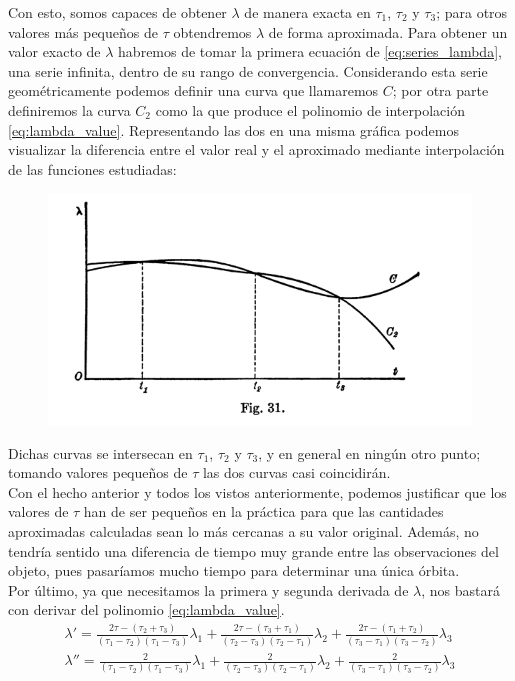 \documentclass[11pt]{article}
\begin{document}
Con esto, somos capaces de obtener $\lambda$ de manera exacta en $\tau_1$, $\tau_2$ y $\tau_3$; para otros valores más pequeños de $\tau$ obtendremos $\lambda$ de forma aproximada. Para obtener un valor exacto de $\lambda$ habremos de tomar la primera ecuación de \eqref{eq:series_lambda}, una serie infinita, dentro de su rango de convergencia. Considerando esta serie geométricamente podemos definir una curva que llamaremos $C$; por otra parte definiremos la curva $C_2$ como la que produce el polinomio de interpolación \eqref{eq:lambda_value}. Representando las dos en una misma gráfica podemos visualizar la diferencia entre el valor real y el aproximado mediante interpolación de las funciones estudiadas:
\begin{figure}[H]
\centering
\includegraphics[scale=0.5]{images/fig_31.png}
\end{figure}

Dichas curvas se intersecan en $\tau_1$, $\tau_2$ y $\tau_3$, y en general en ningún otro punto; tomando valores pequeños de $\tau$ las dos curvas casi coincidirán.\\

Con el hecho anterior y todos los vistos anteriormente, podemos justificar que los valores de $\tau$ han de ser pequeños en la práctica para que las cantidades aproximadas calculadas sean lo más cercanas a su valor original. Además, no tendría sentido una diferencia de tiempo muy grande entre las observaciones del objeto, pues pasaríamos mucho tiempo para determinar una única órbita.\\

Por último, ya que necesitamos la primera y segunda derivada de $\lambda$, nos bastará con derivar del polinomio \eqref{eq:lambda_value}.
\begin{align*}
\lambda' = \frac{2\tau-(\tau_2+\tau_3)}{(\tau_1-\tau_2)(\tau_1-\tau_3)}\lambda_1
+\frac{2\tau-(\tau_3+\tau_1)}{(\tau_2-\tau_3)(\tau_2-\tau_1)}\lambda_2
+\frac{2\tau-(\tau_1+\tau_2)}{(\tau_3-\tau_1)(\tau_3-\tau_2)}\lambda_3\\
\lambda'' = \frac{2}{(\tau_1-\tau_2)(\tau_1-\tau_3)}\lambda_1
+\frac{2}{(\tau_2-\tau_3)(\tau_2-\tau_1)}\lambda_2
+\frac{2}{(\tau_3-\tau_1)(\tau_3-\tau_2)}\lambda_3
\end{align*}
\end{document}
